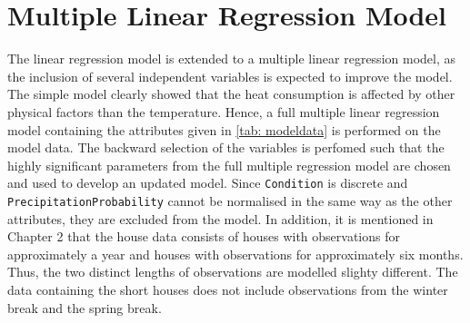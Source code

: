 
\section{Multiple Linear Regression Model}
The linear regression model is extended to a multiple linear regression model, as the inclusion of several independent variables is expected to improve the model. The simple model clearly showed that the heat consumption is affected by other physical factors than the temperature. Hence, a full multiple linear regression model containing the attributes given in \cref{tab: modeldata} is performed on the model data. The backward selection of the variables is perfomed such that the highly significant parameters from the full multiple regression model are chosen and used to develop an updated model. Since \texttt{Condition} is discrete and \texttt{PrecipitationProbability} cannot be normalised in the same way as the other attributes, they are excluded from the model. In addition, it is mentioned in Chapter 2 that the house data consists of houses with observations for approximately a year and houses with observations for approximately six months. Thus, the two distinct lengths of observations are modelled slighty different. The data containing the short houses does not include observations from the winter break and the spring break.

